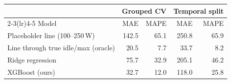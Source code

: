 \begin{tabular}{@{}lrrrr@{}}
\toprule
 & \multicolumn{2}{c}{Grouped CV} & \multicolumn{2}{c}{Temporal split} \\
\cmidrule(lr){2-3}\cmidrule(lr){4-5}
Model & MAE & MAPE & MAE & MAPE \\
\midrule
Placeholder line (100--250\,W) & 142.5 & 65.1 & 250.8 & 65.9 \\
Line through true idle/max (oracle) & 20.5 & 7.7 & 33.7 & 8.2 \\
Ridge regression & 75.7 & 32.9 & 205.1 & 46.2 \\
XGBoost (ours) & 32.7 & 12.0 & 118.0 & 25.8 \\
\bottomrule
\end{tabular}
